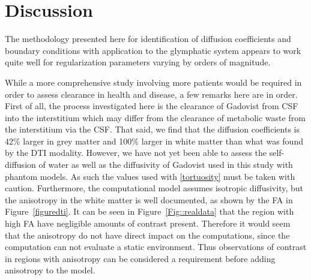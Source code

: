 \documentclass[12pt,a4paper]{article}
\newcommand{\fixme}[1]{\textcolor{orange}{#1}}
\begin{document}
\section{Discussion}
The methodology presented here for identification of diffusion coefficients and boundary conditions with application to the glymphatic system appears to work quite 
well for regularization parameters varying by orders of magnitude. 

While a more comprehensive study involving more patients would be required in order to assess clearance in health and disease, a few remarks here are in order. 
First of all, the process investigated here is the clearance of Gadovist from CSF into the interstitium which may differ from the clearance of metabolic waste 
from the interstitium via the CSF. That said, 
we find that the diffusion coefficients is 42\% larger in grey matter and 100\% larger in white matter than what was found by the DTI modality. %
However, we have not yet been able to assess the self-diffusion of water as well as the diffusivity of Gadovist used in this study with phantom models. As such 
the values used with \eqref{tortuosity} must be taken with caution. Furthermore,    
the computational model assumes isotropic diffusivity, but the anisotropy in the white matter is well documented, as shown by the FA in Figure~\ref{figuredti}. It can be seen in Figure~\ref{Fig::realdata} that the region with high FA have negligible amounts of contrast present. Therefore it would seem that the anisotropy do not have direct impact on the computations, since the computation can not evaluate a static environment. Thus observations of contrast in regions with anisotropy can be considered a requirement before adding anisotropy to the model.
\end{document}

